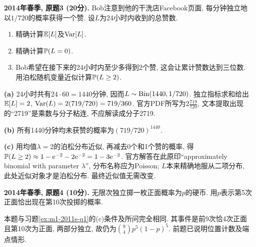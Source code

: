 \begin{exercise}\label{ex:m1-2014s-q3}
\textbf{2014年春季, 原题3 (20分).} Bob注意到他的干洗店Facebook页面, 每分钟独立地以$1/720$的概率获得一个赞. 设$L$为24小时内收到的总赞数.
\begin{enumerate}\item[(a)]\label{ex:m1-2014s-q3-a} 精确计算$\mathbb E[L]$及$\operatorname{Var}[L]$.\item[(b)]\label{ex:m1-2014s-q3-b} 精确计算$\mathbb P(L=0)$.\item[(c)]\label{ex:m1-2014s-q3-c} Bob希望在接下来的24小时内至少多得到2个赞, 这会让累计赞数达到三位数. 用泊松随机变量近似计算$\mathbb P(L\ge2)$.\end{enumerate}
\end{exercise}
\begin{solution}
\textbf{(a)}\label{sol:m1-2014s-q3-a} 24小时共有$24\cdot60=1440$分钟, 因而$L\sim\operatorname{Bin}(1440,1/720)$. 独立指标求和给出$\mathbb E[L]=2$, $\operatorname{Var}(L)=2(719/720)=719/360$. 官方PDF所写为$2\frac{719}{720}$, 文本提取出现的“2719”是乘数与分子粘连, 不应解读成分子2719.

\textbf{(b)}\label{sol:m1-2014s-q3-b} 所有1440分钟均未获赞的概率为$(719/720)^{1440}$.

\textbf{(c)}\label{sol:m1-2014s-q3-c} 用均值$\lambda=2$的泊松分布近似, 再减去0个和1个赞的概率, 得$\mathbb P(L\ge2)\approx1-\mathrm e^{-2}-2\mathrm e^{-2}=1-3\mathrm e^{-2}$. 官方解答在此原印“approximately binomial with parameter $\lambda$”, 分布名称应为Poisson; $L$本来精确地服从二项分布, 此处近似对象才是泊松分布. 最终近似值无需改变.
\end{solution}

\begin{exercise}\label{ex:m1-2014s-q4}
\textbf{2014年春季, 原题4 (10分).} 无限次独立掷一枚正面概率为$p$的硬币. 用$p$表示第5次正面恰出现在第10次投掷的概率.
\end{exercise}
\begin{solution}
\label{sol:m1-2014s-q4}
本题与习题\ref{ex:m1-2011s-q1}的(c)条件及所问完全相同. 其事件是前9次恰4次正面且第10次为正面, 两部分独立, 故仍为$\binom94p^5(1-p)^5$. 前题已说明位置计数及端点情形.
\end{solution}

